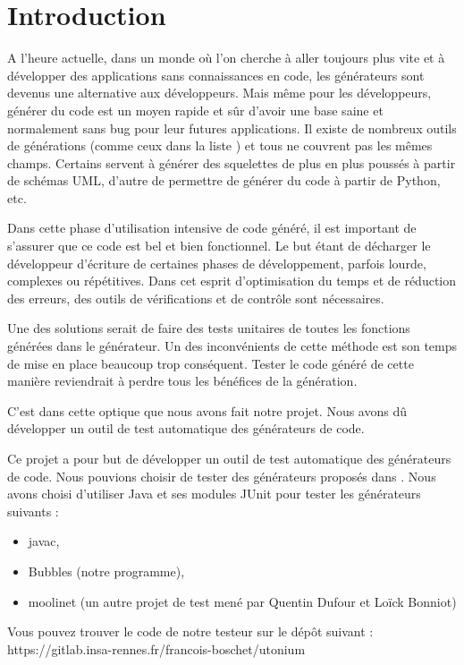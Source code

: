 \chapter*{Introduction}

A l'heure actuelle, dans un monde où l'on cherche à aller toujours plus vite et à développer des applications sans connaissances en code, les générateurs sont devenus une alternative aux développeurs. Mais même pour les développeurs, générer du code est un moyen rapide et sûr d'avoir une base saine et normalement sans bug pour leur futures applications. Il existe de nombreux outils de générations (comme ceux dans la liste \cite{liste_generateurs}) et tous ne couvrent pas les mêmes champs. Certains servent à générer des squelettes de plus en plus poussés à partir de schémas UML, d'autre de permettre de générer du code \jv à partir de Python, etc.

Dans cette phase d'utilisation intensive de code généré, il est important de s'assurer que ce code est bel et bien fonctionnel. Le but étant de décharger le développeur d'écriture de certaines phases de développement, parfois lourde, complexes ou répétitives. Dans cet esprit d'optimisation du temps et de réduction des erreurs, des outils de vérifications et de contrôle sont nécessaires.

Une des solutions serait de faire des tests unitaires de toutes les fonctions générées dans le générateur. Un des inconvénients de cette méthode est son temps de mise en place beaucoup trop conséquent. Tester le code généré de cette manière reviendrait à perdre tous les bénéfices de la génération.

C'est dans cette optique que nous avons fait notre projet. Nous avons dû développer un outil de test automatique des générateurs de code.

\hspace{15pt}


Ce projet a pour but de développer un outil de test automatique des générateurs de code. Nous pouvions choisir de tester des générateurs proposés dans \cite{liste_generateurs}. Nous avons choisi d'utiliser Java et ses modules JUnit pour tester les générateurs suivants :

\begin{itemize}
    \item javac,
    \item Bubbles (notre programme),
    \item moolinet \cite{moolinet}(un autre projet de test mené par Quentin Dufour et Loïck Bonniot)
\end{itemize}

Vous pouvez trouver le code de notre testeur sur le dépôt suivant :
https://gitlab.insa-rennes.fr/francois-boschet/utonium
